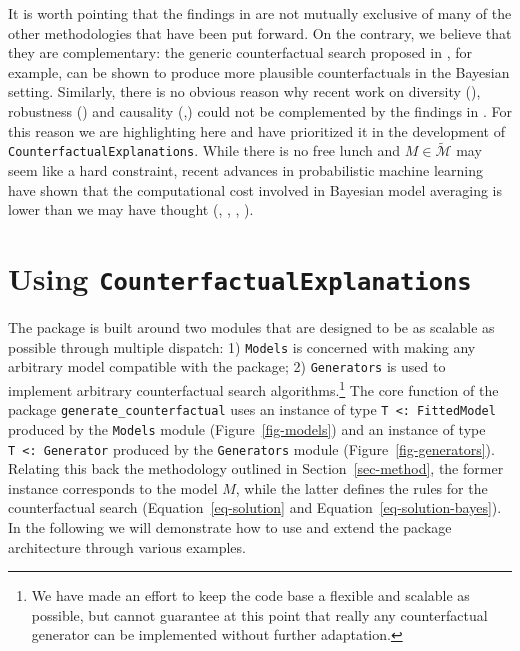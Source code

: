\documentclass[
  letterpaper,
  DIV=11,
  numbers=noendperiod]{scrartcl}
\begin{document}
It is worth pointing that the findings in \cite{schut2021generating} are
not mutually exclusive of many of the other methodologies that have been
put forward. On the contrary, we believe that they are complementary:
the generic counterfactual search proposed in
\cite{wachter2017counterfactual}, for example, can be shown to produce
more plausible counterfactuals in the Bayesian setting. Similarly, there
is no obvious reason why recent work on diversity
(\cite{mothilal2020explaining}), robustness (\cite{upadhyay2021towards})
and causality
(\cite{karimi2020algorithmic},\cite{karimi2021algorithmic}) could not be
complemented by the findings in \cite{schut2021generating}. For this
reason we are highlighting \cite{schut2021generating} here and have
prioritized it in the development of
\texttt{CounterfactualExplanations}. While there is no free lunch and
\(M\in\mathcal{\widetilde{M}}\) may seem like a hard constraint, recent
advances in probabilistic machine learning have shown that the
computational cost involved in Bayesian model averaging is lower than we
may have thought (\cite{gal2016dropout},
\cite{lakshminarayanan2016simple}, \cite{daxberger2021laplace},
\cite{murphy2022probabilistic}).

\hypertarget{sec-use}{%
\section{\texorpdfstring{Using
\texttt{CounterfactualExplanations}}{Using CounterfactualExplanations}}\label{sec-use}}

The package is built around two modules that are designed to be as
scalable as possible through multiple dispatch: 1) \texttt{Models} is
concerned with making any arbitrary model compatible with the package;
2) \texttt{Generators} is used to implement arbitrary counterfactual
search algorithms.\footnote{We have made an effort to keep the code base
  a flexible and scalable as possible, but cannot guarantee at this
  point that really any counterfactual generator can be implemented
  without further adaptation.} The core function of the package
\texttt{generate\_counterfactual} uses an instance of type
\texttt{T\ \textless{}:\ FittedModel} produced by the \texttt{Models}
module (Figure~\ref{fig-models}) and an instance of type
\texttt{T\ \textless{}:\ Generator} produced by the \texttt{Generators}
module (Figure~\ref{fig-generators}). Relating this back the methodology
outlined in Section~\ref{sec-method}, the former instance corresponds to
the model \(M\), while the latter defines the rules for the
counterfactual search (Equation~\ref{eq-solution} and
Equation~\ref{eq-solution-bayes}). In the following we will demonstrate
how to use and extend the package architecture through various examples.
\end{document}
